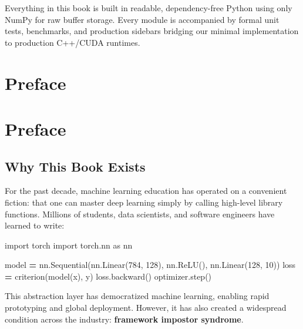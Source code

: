 \documentclass[
  letterpaper,
]{scrbook}
\newenvironment{Shaded}{\begin{snugshade}}{\end{snugshade}}
\newcommand{\DecValTok}[1]{\textcolor[rgb]{0.00,0.00,0.81}{#1}}
\newcommand{\ImportTok}[1]{#1}
\newcommand{\NormalTok}[1]{#1}
\newcommand{\OperatorTok}[1]{\textcolor[rgb]{0.81,0.36,0.00}{\textbf{#1}}}
\begin{document}
Everything in this book is built in readable, dependency-free Python
using only NumPy for raw buffer storage. Every module is accompanied by
formal unit tests, benchmarks, and production sidebars bridging our
minimal implementation to production C++/CUDA runtimes.


\chapter*{Preface}\label{preface}



\chapter*{Preface}\label{preface-1}


\section*{Why This Book Exists}\label{why-this-book-exists}


For the past decade, machine learning education has operated on a
convenient fiction: that one can master deep learning simply by calling
high-level library functions. Millions of students, data scientists, and
software engineers have learned to write:

\begin{Shaded}
\begin{Highlighting}[]
\ImportTok{import}\NormalTok{ torch}
\ImportTok{import}\NormalTok{ torch.nn }\ImportTok{as}\NormalTok{ nn}

\NormalTok{model }\OperatorTok{=}\NormalTok{ nn.Sequential(nn.Linear(}\DecValTok{784}\NormalTok{, }\DecValTok{128}\NormalTok{), nn.ReLU(), nn.Linear(}\DecValTok{128}\NormalTok{, }\DecValTok{10}\NormalTok{))}
\NormalTok{loss }\OperatorTok{=}\NormalTok{ criterion(model(x), y)}
\NormalTok{loss.backward()}
\NormalTok{optimizer.step()}
\end{Highlighting}
\end{Shaded}

This abstraction layer has democratized machine learning, enabling rapid
prototyping and global deployment. However, it has also created a
widespread condition across the industry: \textbf{framework impostor
syndrome}.
\end{document}
